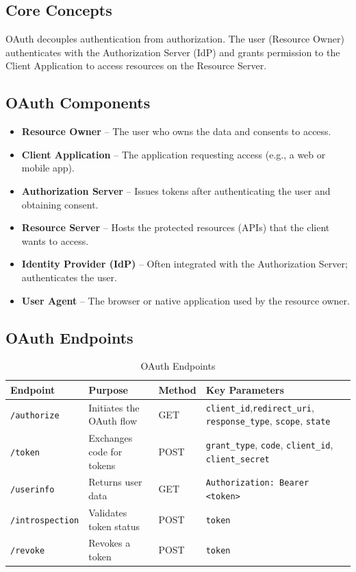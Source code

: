 \documentclass[12pt,a4paper]{article}
\begin{document}
\subsection{Core Concepts}
OAuth decouples authentication from authorization. The user (Resource Owner) authenticates with the Authorization Server (IdP) and grants permission to the Client Application to access resources on the Resource Server.

\subsection{OAuth Components}
\begin{itemize}
    \item \textbf{Resource Owner} – The user who owns the data and consents to access.
    \item \textbf{Client Application} – The application requesting access (e.g., a web or mobile app).
    \item \textbf{Authorization Server} – Issues tokens after authenticating the user and obtaining consent.
    \item \textbf{Resource Server} – Hosts the protected resources (APIs) that the client wants to access.
    \item \textbf{Identity Provider (IdP)} – Often integrated with the Authorization Server; authenticates the user.
    \item \textbf{User Agent} – The browser or native application used by the resource owner.
\end{itemize}

\subsection{OAuth Endpoints}
\vspace*{0.25cm}
\begin{table}[h]
\centering
\begin{tabular}{|p{3cm}|p{4cm}|p{2cm}|p{7cm}|}
\hline
\textbf{Endpoint} & \textbf{Purpose} & \textbf{Method} & \textbf{Key Parameters} \\
\hline
\texttt{/authorize} & Initiates the OAuth flow & GET & \texttt{client\_id},\texttt{redirect\_uri}, \texttt{response\_type}, \texttt{scope}, \texttt{state} \\
\hline
\texttt{/token} & Exchanges code for tokens & POST & \texttt{grant\_type}, \texttt{code}, \texttt{client\_id}, \texttt{client\_secret} \\
\hline
\texttt{/userinfo} & Returns user data & GET & \texttt{Authorization: Bearer <token>} \\
\hline
\texttt{/introspection} & Validates token status & POST & \texttt{token} \\
\hline
\texttt{/revoke} & Revokes a token & POST & \texttt{token} \\
\hline
\end{tabular}
\caption{OAuth Endpoints}
\end{table}
\end{document}
